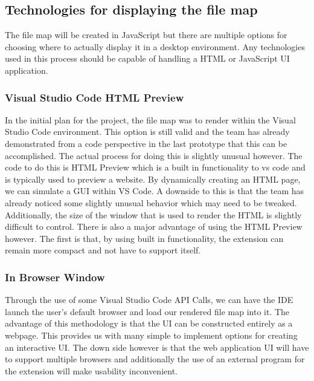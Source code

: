 \documentclass[letterpaper,10pt,titlepage,draftclsnofoot,onecolumn,onesided] {IEEEtran}
\begin{document}
\subsection{Technologies for displaying the file map}
The file map will be created in JavaScript but there are multiple options for choosing where to actually display it in a desktop environment. 
Any technologies used in this process should be capable of handling a HTML or JavaScript UI application.

\subsubsection{Visual Studio Code HTML Preview}
In the initial plan for the project, the file map was to render within the Visual Studio Code environment. 
This option is still valid and the team has already demonstrated from a code perspective in the last prototype that this can be accomplished. 
The actual process for doing this is slightly unusual however. 
The code to do this is HTML Preview which is a built in functionality to vs code and is typically used to preview a website. 
By dynamically creating an HTML page, we can simulate a GUI within VS Code. 
A downside to this is that the team has already noticed some slightly unusual behavior which may need to be tweaked. 
Additionally, the size of the window that is used to render the HTML is slightly difficult to control. 
There is also a major advantage of using the HTML Preview however. 
The first is that, by using built in functionality, the extension can remain more compact and not have to support itself.

\subsubsection{In Browser Window}
Through the use of some Visual Studio Code API Calls, we can have the IDE launch the user's default browser and load our rendered file map into it.
The advantage of this methodology is that the UI can be constructed entirely as a webpage. 
This provides us with many simple to implement options for creating an interactive UI. 
The down side however is that the web application UI will have to support multiple browsers and additionally the use of an external program for the extension will make usability inconvenient. 
\end{document}
